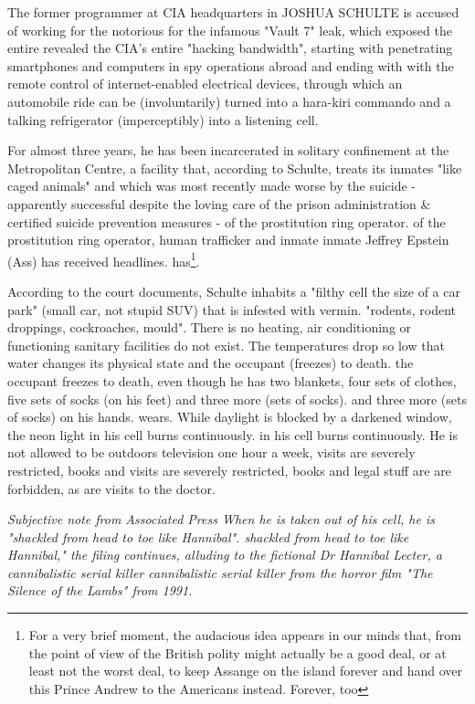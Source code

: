 \begin{multicols}{2}
The former programmer at CIA headquarters in
JOSHUA SCHULTE is accused of working for the notorious
for the infamous "Vault 7" leak, which exposed the entire
revealed the CIA's entire "hacking bandwidth", starting with penetrating smartphones and computers in spy operations abroad and ending with
with the remote control of internet-enabled electrical devices,
through which an automobile ride can be (involuntarily) turned into a hara-kiri commando and a talking refrigerator (imperceptibly) into a listening cell.

For almost three years, he has been incarcerated in solitary confinement at the Metropolitan
Centre, a facility that, according to Schulte, treats its inmates "like caged animals" and which was most recently made worse by the suicide - apparently successful despite the loving care of the prison administration \& certified suicide prevention measures - of the prostitution ring operator.
of the prostitution ring operator, human trafficker and inmate
inmate Jeffrey Epstein (Ass) has received headlines.
has\footnote[16]{For a very brief moment, the audacious idea appears in our minds that, from the point of view of the British polity
might actually be a good deal, or at least not the worst deal, to keep Assange on the island forever
and hand over this Prince Andrew to the Americans instead. Forever, too}.

According to the court documents, Schulte inhabits a
"filthy cell the size of a car park"
(small car, not stupid SUV) that is infested with vermin.
"rodents, rodent droppings, cockroaches, mould". There is no heating, air conditioning or functioning
sanitary facilities do not exist. The temperatures drop so low
that water changes its physical state and the occupant (freezes) to death.
the occupant freezes to death, even though he has two blankets, four sets of clothes, five sets of socks (on his feet) and three more (sets of socks).
and three more (sets of socks) on his hands.
wears.
While daylight is blocked by a darkened window, the neon light in his cell burns continuously.
in his cell burns continuously. He is not allowed to be outdoors
television one hour a week, visits are severely restricted, books and
visits are severely restricted, books and legal stuff are
are forbidden, as are visits to the doctor.

\textit{Subjective note from Associated Press
When he is taken out of his cell, he is "shackled from head to toe like Hannibal".
shackled from head to toe like Hannibal," the filing continues,
alluding to the fictional Dr Hannibal Lecter, a cannibalistic serial killer
cannibalistic serial killer from the horror film
"The Silence of the Lambs" from 1991}.


\end{multicols}
